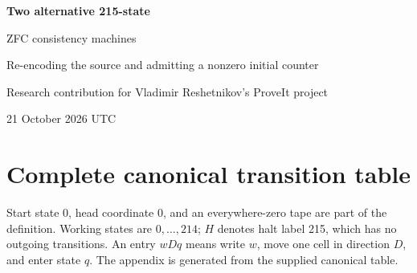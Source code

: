 \documentclass[11pt]{article}
\begin{document}
\begin{center}
{\LARGE\bfseries Two alternative 215-state\par ZFC consistency machines}\par\vspace{8pt}
{\large Re-encoding the source and admitting a nonzero initial counter}\par\vspace{5pt}
{Research contribution for Vladimir Reshetnikov's ProveIt project}\par
{21 October 2026 UTC}
\end{center}
\begin{abstract}
We give two binary, single-tape, blank-start machines with 215 working states whose nonhalting is equivalent to the consistency of ZFC. The primary construction is a source re-encoding. This is an alternative construction, not a 214-state result. Its transition graph is not a relabeling of the three compared 215-state baselines. Relative to the primary baseline, it changes 17 transition rows and 4,519 source instruction addresses, while retaining the same 4,751 primitive operations and their complete guarded ordinal control graph. The number of addresses containing six consecutive zero bits decreases from 37 to 33; the source DAG remains at 202 nodes.

The important additional proof obligation is initialization. The new machine reaches its genuine source root after 716,307 transitions with next-candidate register 4 and additive counter 1, rather than the old zero-counter seed. We prove that an arbitrary natural initial counter is harmless: command soundness already permits it, and a cofinal family of refutation programs begins by resetting it. Fresh unbounded runtime verification establishes all 6,176 guarded primitive cases for this literal table. The resulting proof is ordinary mathematics formalizable in ZFC, not a newly kernel-checked Lean or Rocq theorem. The calculus itself is inherited unchanged; the primary contribution is a materially different physical encoding and a more flexible initialization theorem. A second table gives a distinct physical allocation of the recently published sixth-axiom sampler source, together with its adjusted strong compiler and separate runtime and blank-start verification.
\end{abstract}
\setcounter{tocdepth}{1}\tableofcontents






\clearpage\appendix
\section{Complete canonical transition table}
Start state 0, head coordinate 0, and an everywhere-zero tape are part of the definition. Working states are $0,\ldots,214$; $H$ denotes halt label 215, which has no outgoing transitions. An entry $wDq$ means write $w$, move one cell in direction $D$, and enter state $q$. The appendix is generated from the supplied canonical table.

\end{document}
